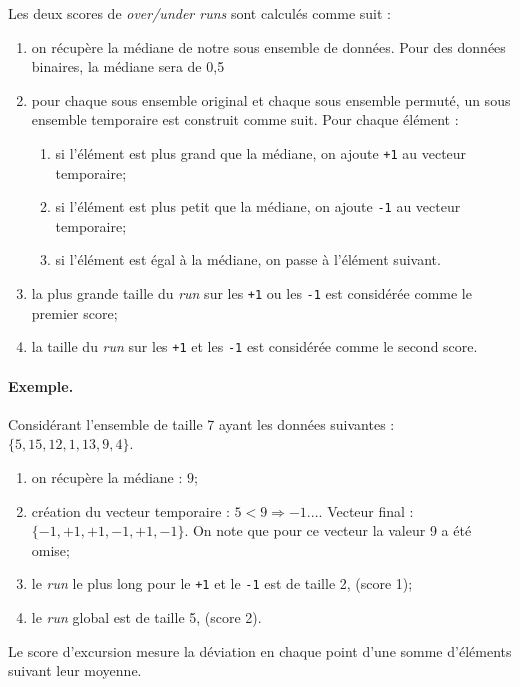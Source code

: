  
Les deux scores de \textit{over/under runs} sont calculés comme suit : 
\begin{enumerate}
\item on récupère la médiane de notre sous ensemble de données. Pour des données binaires, la médiane sera de 0,5
\item pour chaque sous ensemble original et chaque sous ensemble permuté, un sous ensemble temporaire est construit comme suit. Pour chaque élément : 
	\begin{enumerate}
	\item si l'élément est plus grand que la médiane, on ajoute \texttt{+1} au vecteur temporaire;
 	\item si l'élément est plus petit que la médiane, on ajoute \texttt{-1} au vecteur temporaire;
	\item si l'élément est égal à la médiane, on passe à l'élément suivant.\\
	\end{enumerate}
\item la plus grande taille du \textit{run} sur les \texttt{+1} ou les \texttt{-1} est considérée comme le premier score;
\item la taille du \textit{run} sur les \texttt{+1} et les \texttt{-1} est considérée comme le second score.\\
\end{enumerate}

\paragraph{Exemple.\\}
Considérant l'ensemble de taille 7 ayant les données suivantes : $\lbrace 5,15,12,1,13,9,4\rbrace$.
\begin{enumerate}
\item on récupère la médiane : $9$;
\item création du vecteur temporaire : $5<9 \Rightarrow -1 ...$. Vecteur final : $\lbrace -1, +1,+1,-1,+1,-1 \rbrace$. On note que pour ce vecteur la valeur 9 a été omise;
\item le \textit{run} le plus long pour le \texttt{+1} et le \texttt{-1} est de taille 2, (score 1);
\item le \textit{run} global est de taille 5, (score 2).\\
\end{enumerate}

Le score d'excursion mesure la déviation en chaque point d'une somme d'éléments suivant leur moyenne.

